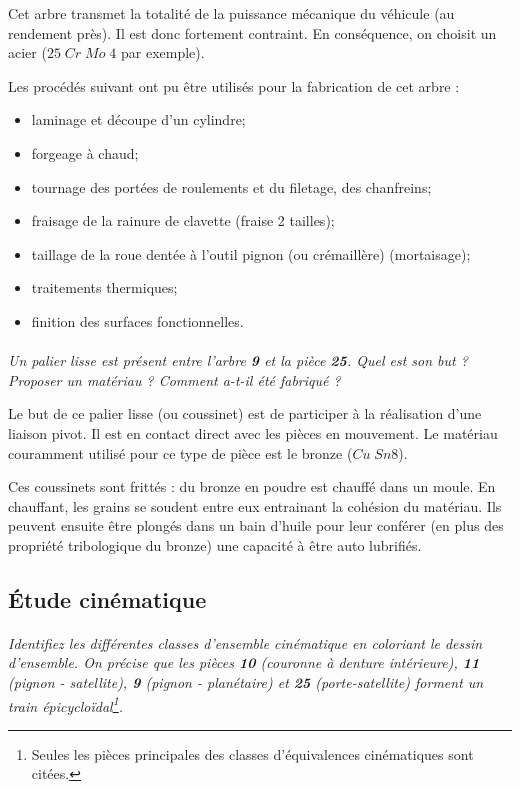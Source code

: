\documentclass[11pt,oneside]{article}
\begin{document}
Cet arbre transmet la totalité de la puissance mécanique du véhicule (au rendement près). Il est donc fortement contraint. En conséquence, on choisit un acier ($25\; Cr\; Mo\; 4$ par exemple). 

Les procédés suivant ont pu être utilisés pour la fabrication de cet arbre : 
\begin{itemize}
\item laminage et découpe d'un cylindre;
\item forgeage à chaud;
\item tournage des portées de roulements et du filetage, des chanfreins;
\item fraisage de la rainure de clavette (fraise 2 tailles);
\item taillage de la roue dentée à l'outil pignon (ou crémaillère) (mortaisage);
\item traitements thermiques;
\item finition des surfaces fonctionnelles.
\end{itemize}


\paragraph{}
\textit{Un palier lisse est présent entre l'arbre \textbf{9} et la pièce \textbf{25}. Quel est son but ? Proposer un matériau ? Comment a-t-il été fabriqué ?}

Le but de ce palier lisse (ou coussinet) est de participer à la réalisation d'une liaison pivot. Il est en contact direct avec les pièces en mouvement. Le matériau couramment utilisé pour ce type de pièce est le bronze ($Cu \; Sn 8$). 

Ces coussinets sont frittés : du bronze en poudre est chauffé dans un moule. En chauffant, les grains se soudent entre eux entrainant la cohésion du matériau. Ils peuvent ensuite être plongés dans un bain d'huile pour leur conférer (en plus des propriété tribologique du bronze) une capacité à être auto lubrifiés. 

\subsection{Étude cinématique}

\paragraph{}
\textit{Identifiez les différentes classes d'ensemble cinématique en coloriant le dessin d'ensemble. On précise que les pièces \textbf{10} (couronne à denture intérieure), \textbf{11}  (pignon - satellite), \textbf{9} (pignon - planétaire) et \textbf{25} (porte-satellite) forment un train épicycloïdal\footnote{Seules les pièces principales des classes d'équivalences cinématiques sont citées.}.}
\end{document}
